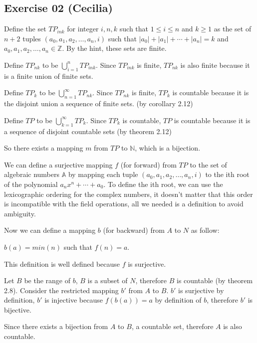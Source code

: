 \subsection*{Exercise 02 (Cecilia)}
Define the set $ TP_{ink} $ for integer $ i, n, k $ such that $ 1 \leq i \leq n $ and $ k \ge 1 $ as the set of $ n + 2 $ tuples $ (a_0, a_1, a_2, \dots, a_n, i) $ such that $ |a_0| + |a_1| + \cdots + |a_n| = k $ and $ a_0, a_1, a_2, \dots, a_n \in \mathbb{Z} $. By the hint, these sets are finite.

Define $ TP_{nk} $ to be $ \bigcup_{i=1}^n TP_{ink} $. Since $ TP_{ink} $ is finite, $ TP_{nk} $ is also finite because it is a finite union of finite sets.

Define $ TP_k $ to be $ \bigcup_{n=1}^\infty TP_{nk} $. Since $ TP_{nk} $ is finite, $ TP_k $ is countable because it is the disjoint union a sequence of finite sets. (by corollary 2.12)

Define $ TP $ to be $ \bigcup_{k=1}^\infty TP_k $. Since $ TP_k $ is countable, $ TP $ is countable because it is a sequence of disjoint countable sets (by theorem 2.12)

So there exists a mapping $ m $ from $ TP $ to $ \mathbb{N} $, which is a bijection.

We can define a surjective mapping $ f $ (for forward) from $ TP $ to the set of algebraic numbers $ \mathbb{A} $ by mapping each tuple $ (a_0, a_1, a_2, \dots, a_n, i) $ to the ith root of the polynomial $ a_nx^n + \cdots + a_0 $. To define the ith root, we can use the lexicographic ordering for the complex numbers, it doesn't matter that this order is incompatible with the field operations, all we needed is a definition to avoid ambiguity. 

Now we can define a mapping $ b $ (for backward) from $ A $ to $ N $ as follow:

$ b(a) = min(n) $  such that $ f(n) = a $.

This definition is well defined because $ f $ is surjective.

Let $ B $ be the range of $ b $, $ B $ is a subset of $ N $, therefore $ B $ is countable (by theorem 2.8). Consider the restricted mapping $ b' $ from $ A $ to $ B $. $ b' $ is surjective by definition, $ b' $ is injective because $ f(b(a)) = a $ by definition of $ b $, therefore $ b' $ is bijective. 

Since there exists a bijection from $ A $ to $ B $, a countable set, therefore $ A $ is also countable.